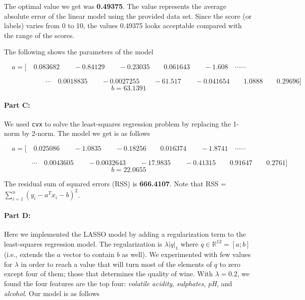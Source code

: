 The optimal value we get was \textbf{0.49375}. The value represents the average absolute error of the linear model using the provided data set. Since the score (or labels) varies from 0 to 10, the values 0.49375 looks acceptable compared with the range of the scores.

The following shows the parameters of the model
\begin{footnotesize}
$$
a= \text{[}\quad 0.083682\qquad -0.84129\qquad -0.23035\qquad 0.061643\qquad -1.608 \quad \cdots\cdots
$$

$$
\qquad \qquad \qquad \cdots \quad 0.0018835\qquad -0.0027255\qquad -61.517\qquad -0.041654\qquad 1.0888\qquad 0.29696 \text{]}
$$
$$
b = 63.1391
$$
\end{footnotesize}


\paragraph{Part C:}
We used \texttt{cvx} to solve the least-squares regression problem by replacing the 1-norm by 2-norm. The model we get is as follows 
\begin{footnotesize}
$$
a= \text{[}\quad 0.025086 \qquad -1.0835 \qquad -0.18256 \qquad 0.016374 \qquad -1.8741\quad \cdots\cdots
$$

$$
\qquad \qquad  \cdots \quad 0.0043605 \qquad -0.0032643 \qquad -17.9835 \qquad -0.41315 \qquad 0.91647 \qquad 0.2761  \text{]}
$$
$$
b = 22.0655
$$
\end{footnotesize}
The residual sum of squared errors (RSS) is \textbf{666.4107}. Note that  RSS = $\sum_{i=1}^{n}(y_{i}-a^{T}x_{i}-b)^{2}$.  %

\paragraph{Part D:}
Here we implemented the LASSO model by adding a regularization term to the least-squares regression model. The regularization is $\lambda |q|_{1}$ where $q\in \mathbb{R}^12 = [a;b]$ (i.e., extends the $a$ vector to contain $b$ as well). We experimented with few values for $\lambda$ in order to reach a value that will turn most of the elements of $q$ to zero except four of them; those that determines the quality of wine. With $\lambda = 0.2$, we found the four features are the top four: \emph{volatile acidity}, \emph{sulphates}, \emph{pH}, and \emph{alcohol}. Our model is as follows 


